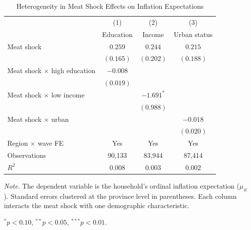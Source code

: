 \begin{table}[!htbp]
\centering
\caption{Heterogeneity in Meat Shock Effects on Inflation Expectations}
\label{tab:heterogeneity}
\begin{threeparttable}
\begin{tabular}{lccc}
\toprule
& (1) & (2) & (3) \\
& Education & Income & Urban status \\
\midrule
Meat shock & $0.259$ & $0.244$ & $0.215$ \\
& $(0.165)$ & $(0.202)$ & $(0.188)$ \\[4pt]
Meat shock $\times$ high education & $-0.008$ &  &  \\
& $(0.019)$ &  &  \\[4pt]
Meat shock $\times$ low income &  & $-1.691^{*}$ &  \\
&  & $(0.988)$ &  \\[4pt]
Meat shock $\times$ urban &  &  & $-0.018$ \\
&  &  & $(0.020)$ \\[4pt]
\midrule
Region $\times$ wave FE & Yes & Yes & Yes \\
Observations & 90,133 & 83,944 & 87,414 \\
$R^2$ & 0.008 & 0.003 & 0.002 \\
\bottomrule
\end{tabular}
\begin{tablenotes}[flushleft]
\footnotesize
\item \textit{Note.} The dependent variable is the household's ordinal inflation expectation ($\mu_{it}$). Standard errors clustered at the province level in parentheses. Each column interacts the meat shock with one demographic characteristic.
\item $^{*}p<0.10$, $^{**}p<0.05$, $^{***}p<0.01$.
\end{tablenotes}
\end{threeparttable}
\end{table}
